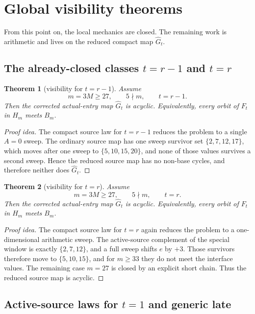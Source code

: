 \documentclass[11pt]{article}
\newtheorem{theorem}{Theorem}[section]
\newcommand{\1}{\mathbf 1}
\newcommand{\Hm}{H_m}
\newcommand{\Bm}{B_m}
\newcommand{\Gt}{\widehat G_t}
\begin{document}
\section{Global visibility theorems}

From this point on, the local mechanics are closed.
The remaining work is arithmetic and lives on the reduced compact map \(\Gt\).

\subsection{The already-closed classes \(t=r-1\) and \(t=r\)}

\begin{theorem}[visibility for \(t=r-1\)]
Assume
\[
m=3M\ge 27,\qquad 5\nmid m,\qquad t=r-1.
\]
Then the corrected actual-entry map \(\Gt\) is acyclic.
Equivalently, every orbit of \(F_t\) in \(\Hm\) meets \(\Bm\).
\end{theorem}

\begin{proof}[Proof idea]
The compact source law for \(t=r-1\) reduces the problem to a single \(A=0\) sweep.
The ordinary source map has one sweep survivor set \(\{2,7,12,17\}\), which moves after one sweep to \(\{5,10,15,20\}\), and none of those values survives a second sweep.
Hence the reduced source map has no non-base cycles, and therefore neither does \(\Gt\).
\end{proof}

\begin{theorem}[visibility for \(t=r\)]
Assume
\[
m=3M\ge 27,\qquad 5\nmid m,\qquad t=r.
\]
Then the corrected actual-entry map \(\Gt\) is acyclic.
Equivalently, every orbit of \(F_t\) in \(\Hm\) meets \(\Bm\).
\end{theorem}

\begin{proof}[Proof idea]
The compact source law for \(t=r\) again reduces the problem to a one-dimensional arithmetic sweep.
The active-source complement of the special window is exactly \(\{2,7,12\}\), and a full sweep shifts \(e\) by \(+3\).
Those survivors therefore move to \(\{5,10,15\}\), and for \(m\ge 33\) they do not meet the interface values.
The remaining case \(m=27\) is closed by an explicit short chain.
Thus the reduced source map is acyclic.
\end{proof}

\subsection{Active-source laws for \(t=1\) and generic late}
\end{document}
